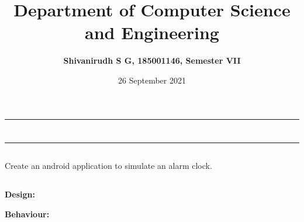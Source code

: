 \documentclass[12pt,letterpaper]{article}
\title{\textbf{Department of Computer Science and Engineering}}
\author{\textbf{Shivanirudh S G, 185001146, Semester VII }}
\date{26 September 2021}
\begin{document}
\maketitle
\hrule
\section*{}
\hrule 
\bigskip\bigskip

\subsection*{}

\subsection*{}
\begin{flushleft}
    Create an android application to simulate an alarm clock.
\end{flushleft}

\subsection*{}
\subsubsection*{}
\textbf{Design:}
\begin{flushleft}

\end{flushleft}
\textbf{Behaviour:}
\begin{flushleft}

\end{flushleft}
\begin{flushleft}

\end{flushleft}

\newpage
\end{document}
